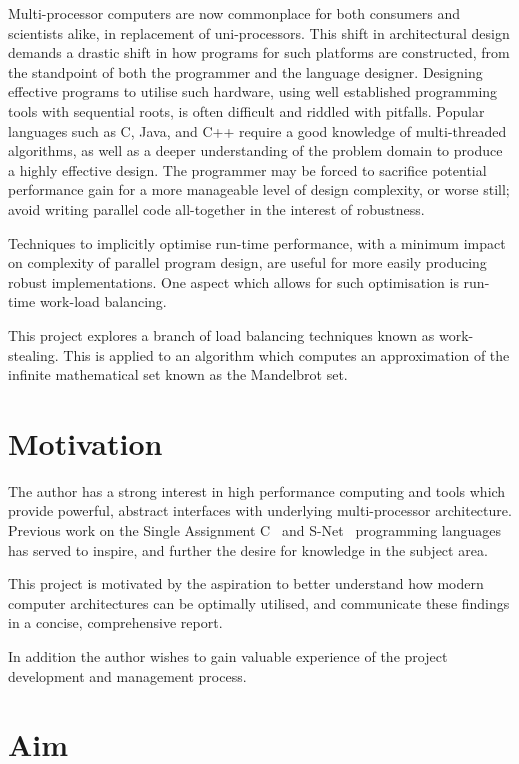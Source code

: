 Multi-processor computers are now commonplace for both consumers and scientists alike, in replacement of uni-processors. 
This shift in architectural design demands a drastic shift in how programs for such platforms are constructed, 
from the standpoint of both the programmer and the language designer. 
Designing effective programs to utilise such hardware, using well established programming tools with sequential roots,
is often difficult and riddled with pitfalls. Popular languages such as C, Java, and C++ require a good knowledge of multi-threaded 
algorithms, as well as a deeper understanding of the problem domain to produce a highly effective design.
The programmer may be forced to sacrifice potential performance gain for a more manageable level of design complexity,
or worse still; avoid writing parallel code all-together in the interest of robustness.

Techniques to implicitly optimise run-time performance, with a minimum impact on complexity of parallel program design, 
are useful for more easily producing robust implementations. One aspect which allows for such optimisation is run-time work-load balancing.

This project explores a branch of load balancing techniques known as work-stealing. This is applied to an algorithm which
computes an approximation of the infinite mathematical set known as the Mandelbrot set.

\section*{Motivation}

The author has a strong interest in high performance computing and tools which provide powerful, abstract interfaces with 
underlying multi-processor architecture. Previous work on the Single Assignment C~\cite{sachome} and 
S-Net~\cite{snethome} programming languages has served to inspire, and further the desire for knowledge in the subject area.

This project is motivated by the aspiration to better understand how modern computer architectures can be optimally utilised,
and communicate these findings in a concise, comprehensive report.

In addition the author wishes to gain valuable experience of the project development and management process.

\section*{Aim}

